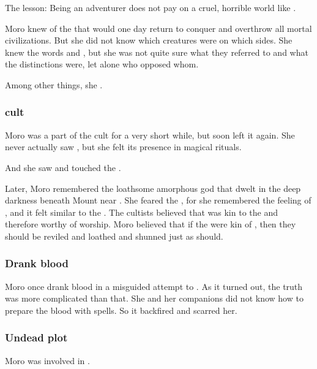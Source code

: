 The lesson: Being an adventurer does not pay on a cruel, horrible world like \Miith.

Moro knew of the  that would one day return to conquer \Miith and overthrow all mortal civilizations. 
But she did not know which creatures were on which sides. 
She knew the words \quo{\xs} and \quo{\bane}, but she was not quite sure what they referred to and what the distinctions were, let alone who opposed whom. 

Among other things, she .





\subsubsection{\Ubloth cult}
Moro was a part of the  cult for a very short while, but soon left it again.
She never actually saw \Ubloth, but she felt its presence in magical rituals. 

And she saw and touched the . 

Later, Moro remembered the loathsome amorphous god \Ubloth that dwelt in the deep darkness beneath Mount \Shrun near \Yormis. 
She feared the \Primordials, for she remembered the feeling of \Ubloth, and it felt similar to the \Primordials.
The \Ubloth cultists believed that \Ubloth was kin to the \Primordials and therefore worthy of worship.
Moro believed that if the \Primordials were kin of \Ubloth, then they should be reviled and loathed and shunned just as \Ubloth should. 





\subsubsection{Drank \draconian blood}
Moro once drank \dragon blood in a misguided attempt to .
As it turned out, the truth was more complicated than that.
She and her companions did not know how to prepare the \dragon blood with spells.
So it backfired and scarred her.





\subsubsection{Undead plot}
Moro was involved in . 






